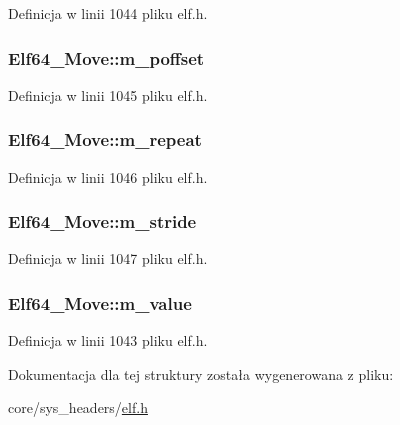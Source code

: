 Definicja w linii 1044 pliku elf.\-h.

\hypertarget{struct_elf64___move_a36fe21def9afee88be6acc62e45fdeba}{
\subsubsection[{m\-\_\-poffset}]{ Elf64\-\_\-\-Move\-::m\-\_\-poffset}}\label{struct_elf64___move_a36fe21def9afee88be6acc62e45fdeba}


Definicja w linii 1045 pliku elf.\-h.

\hypertarget{struct_elf64___move_ab6f1c59b8b9789cdd223fa525937dbdb}{
\subsubsection[{m\-\_\-repeat}]{ Elf64\-\_\-\-Move\-::m\-\_\-repeat}}\label{struct_elf64___move_ab6f1c59b8b9789cdd223fa525937dbdb}


Definicja w linii 1046 pliku elf.\-h.

\hypertarget{struct_elf64___move_ac999afc6aec249cd19ebbef408228c95}{
\subsubsection[{m\-\_\-stride}]{ Elf64\-\_\-\-Move\-::m\-\_\-stride}}\label{struct_elf64___move_ac999afc6aec249cd19ebbef408228c95}


Definicja w linii 1047 pliku elf.\-h.

\hypertarget{struct_elf64___move_ab6ef52b74b3742b569dcacc4a7f835df}{
\subsubsection[{m\-\_\-value}]{ Elf64\-\_\-\-Move\-::m\-\_\-value}}\label{struct_elf64___move_ab6ef52b74b3742b569dcacc4a7f835df}


Definicja w linii 1043 pliku elf.\-h.



Dokumentacja dla tej struktury została wygenerowana z pliku\-:\begin{DoxyCompactItemize}
\item 
core/sys\-\_\-headers/\hyperlink{elf_8h}{elf.\-h}\end{DoxyCompactItemize}
